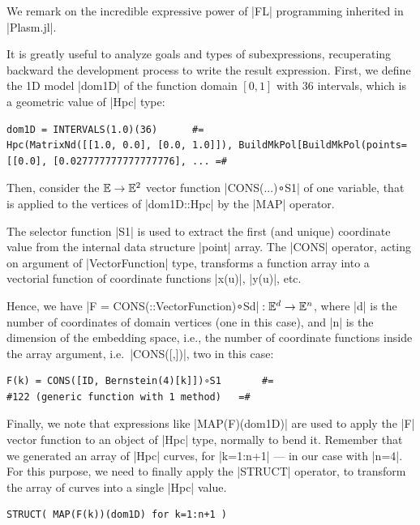 \begin{coding}
We remark on the incredible expressive power of |FL| programming inherited in |Plasm.jl|.

It is greatly useful to analyze goals and types of subexpressions, recuperating backward the development process to  write the result expression.
First, we define the 1D model |dom1D| of the function domain $[0,1]$ with 36 intervals, which is a geometric value of |Hpc| type:

\begin{lstlisting}[language=JuliaLocal, style=julia]
dom1D = INTERVALS(1.0)(36)  	#=
Hpc(MatrixNd([[1.0, 0.0], [0.0, 1.0]]), BuildMkPol[BuildMkPol(points=[[0.0], [0.027777777777777776], ... =#
\end{lstlisting}

Then, consider the $\mathbb{E}\to\mathbb{E}^2$ vector function |CONS(...)∘S1| of one variable, that is applied to the vertices of |dom1D::Hpc| by the |MAP| operator. 

The selector function |S1| is used to extract the first (and unique) coordinate value from the internal data structure |point| array. The |CONS| operator, acting on argument of |Vector{Function}| type, transforms a  function array into a vectorial function of coordinate functions |x(u)|, |y(u)|, etc. 

Hence, we have |F = CONS(::Vector{Function})∘Sd|${} : \mathbb{E}^d\to\mathbb{E}^n$, where |d| is the number of coordinates of domain vertices (one in this case), and |n| is the dimension of the embedding space, i.e., the number of coordinate functions inside the array argument, i.e.~|CONS([,])|, two in this case:

\begin{lstlisting}[language=JuliaLocal, style=julia]
F(k) = CONS([ID, Bernstein(4)[k]])∘S1		#=
#122 (generic function with 1 method)	=#
\end{lstlisting}

Finally, we note that expressions like |MAP(F)(dom1D)| are used to apply the |F| vector function to an object of |Hpc| type, normally to bend it.
Remember that we  generated an array of |Hpc| curves, for |k=1:n+1| --- in our case with |n=4|. For this purpose, we need to finally apply the |STRUCT| operator, to transform the array of curves into a single |Hpc| value.
\begin{lstlisting}[language=JuliaLocal, style=julia]
STRUCT( MAP(F(k))(dom1D) for k=1:n+1 )
\end{lstlisting}

\end{coding}


